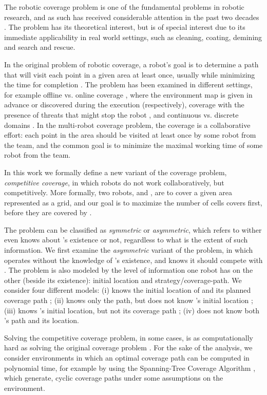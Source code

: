 The robotic coverage problem is one of the fundamental problems in robotic research, and as such has received considerable attention in the past two decades \cite{galceran2013survey}. The problem has its theoretical interest, but is of special interest due to its immediate applicability in real world settings, such as cleaning, coating, demining and search and rescue. 

In the original problem of robotic coverage, a robot's goal is to determine a path that will visit each point in a given area at least once, usually while minimizing the time for completion \cite{galceran2013survey}. The problem has been examined in different settings, for example offline vs. online coverage \cite{gabriely2001spanning,agmon2008giving}, where the environment map is given in advance or discovered during the execution (respectively), coverage with the presence of threats that might stop the robot \cite{yehoshua2014safest}, and continuous vs. discrete domains \cite{gabriely2001spanning,yang2004neural}. In the multi-robot coverage problem, the coverage is a collaborative effort: each point in the area should be visited at least once by some robot from the team, and the common goal is to minimize the maximal working time of some robot from the team. 

In this work we formally define a new variant of the coverage problem, {\em competitive coverage}, in which robots do not work collaboratively, but competitively. More formally, two robots, \rob and \opp, are to cover a given area represented as a grid, and our goal is to maximize the number of cells \rob covers first, before they are covered by \opp.

The problem can be classified as {\em symmetric} or {\em asymmetric}, which refers to wither \opp even knows about \rob's existence or not, regardless to what is the extent of such information. We first examine the {\em asymmetric} variant of the problem, in which \opp operates without the knowledge of \rob's existence, and \rob knows it should compete with \opp. The problem is also modeled by the level of information one robot has on the other (beside its existence): initial location and strategy/coverage-path. We consider four different models: (i) \rob knows the initial location of \opp and its planned coverage path ; (ii) \rob knows only the path, but does not know \opp's initial location ; (iii) \rob knows \opp's initial location, but not its coverage path ; (iv) \rob does not know both \opp's path and its location.

Solving the competitive coverage problem, in some cases, is as computationally hard as solving the original coverage problem \cite{arkin2000approximation}. For the sake of the analysis, we consider environments in which an optimal coverage path can be computed in polynomial time, for example by using the Spanning-Tree Coverage Algorithm \cite{gabriely2001spanning}, which generate, cyclic coverage paths under some assumptions on the environment. 

